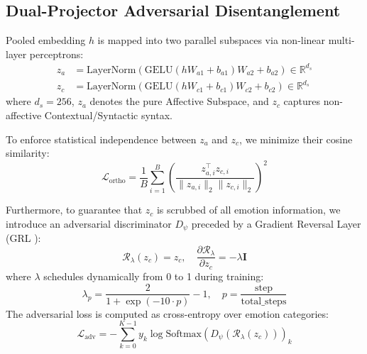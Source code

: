 \documentclass[journal,twocolumn]{article}
\begin{document}
\subsection{Dual-Projector Adversarial Disentanglement}
Pooled embedding $h$ is mapped into two parallel subspaces via non-linear multi-layer perceptrons:
\begin{align}
    z_a &= \text{LayerNorm}(\text{GELU}(h W_{a1} + b_{a1}) W_{a2} + b_{a2}) \in \mathbb{R}^{d_s} \\
    z_c &= \text{LayerNorm}(\text{GELU}(h W_{c1} + b_{c1}) W_{c2} + b_{c2}) \in \mathbb{R}^{d_s}
\end{align}
where $d_s = 256$, $z_a$ denotes the pure Affective Subspace, and $z_c$ captures non-affective Contextual/Syntactic syntax.

To enforce statistical independence between $z_a$ and $z_c$, we minimize their cosine similarity:
\begin{equation}
    \mathcal{L}_{\text{ortho}} = \frac{1}{B} \sum_{i=1}^B \left( \frac{z_{a,i}^\top z_{c,i}}{\|z_{a,i}\|_2 \|z_{c,i}\|_2} \right)^2
\end{equation}

Furthermore, to guarantee that $z_c$ is scrubbed of all emotion information, we introduce an adversarial discriminator $D_\psi$ preceded by a Gradient Reversal Layer (GRL \cite{ganin2016domain}):
\begin{equation}
    \mathcal{R}_\lambda(z_c) = z_c, \quad \frac{\partial \mathcal{R}_\lambda}{\partial z_c} = -\lambda \mathbf{I}
\end{equation}
where $\lambda$ schedules dynamically from 0 to 1 during training:
\begin{equation}
    \lambda_p = \frac{2}{1 + \exp(-10 \cdot p)} - 1, \quad p = \frac{\text{step}}{\text{total\_steps}}
\end{equation}
The adversarial loss is computed as cross-entropy over emotion categories:
\begin{equation}
    \mathcal{L}_{\text{adv}} = -\sum_{k=0}^{K-1} y_k \log \text{Softmax}(D_\psi(\mathcal{R}_\lambda(z_c)))_k
\end{equation}
\end{document}
